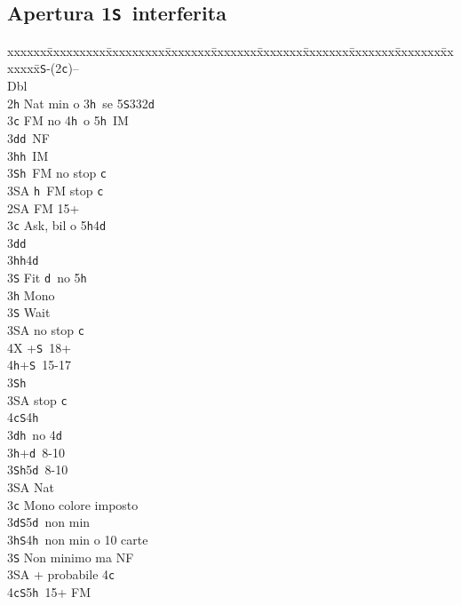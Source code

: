 \documentclass[a4paper,italian]{article}
\newcommand{\BS}{\small{\texttt{S}}}
\newcommand{\BC}{\small{\texttt{c}}}
\newcommand{\BD}{\small{\texttt{d}}}
\newcommand{\BH}{\small{\texttt{h}}}
\newcommand{\pdfs}{\texorpdfstring{\texttt{S}}{S}}
\newenvironment{bidtable}
{\begin{tabbing}

    xxxxxx\=xxxxxxxxx\=xxxxxxxxx\=xxxxxxx\=xxxxxxx\=xxxxxxx\=xxxxxxx\=xxxxxxx\=xxxxxxx\=xxxxxxx\=\kill}
{\end{tabbing} }%
\begin{document}
\begin{multicols}{2}
    \subsection{Apertura 1\pdfs\ interferita}

    \begin{bidtable}
        1\BS-(2\BC)--\+\\
        Dbl\+\\
        2\BH \> Nat min o 3\BH\ se 5\BS332\BD\+\\
        3\BC \> FM no 4\BH\ o 5\BH\ IM\\
        3\BD {}\BD\ NF\\
        3\BH {}\BH\ IM\\
        3\BS {}\BH\ FM no stop \BC \\
        3\small{SA} \BH\ FM stop \BC \-\\
        2\small{SA} \> FM 15+\+\\
        3\BC \> Ask, bil o 5\BH4\BD\+\\
        3\BD {}\BD \+\\
        3\BH {}\BH 4\BD \\
        3\BS \> Fit \BD\ no 5\BH \-\\
        3\BH \> Mono\+\\
        3\BS \> Wait\+\\
        3\small{SA}  no stop \BC \\
        4X +\BS\ 18+\\
        4\BH {}+\BS\ 15-17\-\-\\
        3\BS {}\BH\\
        3\small{SA}  stop \BC \\
        4\BC {}\BS 4\BH \-\\
        3\BD {}\BH\ no 4\BD \\
        3\BH {}+\BD\ 8-10\\
        3\BS {}\BH 5\BD\ 8-10\\
        3\small{SA} \> Nat\-\\
        3\BC \> Mono colore imposto\\
        3\BD {}\BS 5\BD\ non min\\
        3\BH {}\BS 4\BH\ non min o 10 carte \\
        3\BS \> Non minimo ma NF\\
        3\small{SA} + probabile 4\BC \\
        4\BC {}\BS 5\BH\ 15+ FM \-\\

\end{bidtable}
\end{multicols}
\end{document}
